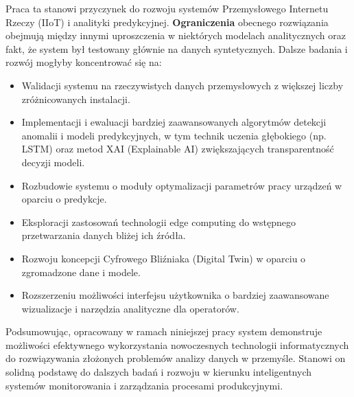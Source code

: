 Praca ta stanowi przyczynek do rozwoju systemów Przemysłowego Internetu Rzeczy (IIoT) i analityki predykcyjnej. \textbf{Ograniczenia} obecnego rozwiązania obejmują między innymi uproszczenia w niektórych modelach analitycznych oraz fakt, że system był testowany głównie na danych syntetycznych. Dalsze badania i rozwój mogłyby koncentrować się na:
\begin{itemize}
    \item Walidacji systemu na rzeczywistych danych przemysłowych z większej liczby zróżnicowanych instalacji.
    \item Implementacji i ewaluacji bardziej zaawansowanych algorytmów detekcji anomalii i modeli predykcyjnych, w tym technik uczenia głębokiego (np. LSTM) oraz metod XAI (Explainable AI) zwiększających transparentność decyzji modeli.
    \item Rozbudowie systemu o moduły optymalizacji parametrów pracy urządzeń w oparciu o predykcje.
    \item Eksploracji zastosowań technologii edge computing do wstępnego przetwarzania danych bliżej ich źródła.
    \item Rozwoju koncepcji Cyfrowego Bliźniaka (Digital Twin) w oparciu o zgromadzone dane i modele.
    \item Rozszerzeniu możliwości interfejsu użytkownika o bardziej zaawansowane wizualizacje i narzędzia analityczne dla operatorów.
\end{itemize}

Podsumowując, opracowany w ramach niniejszej pracy system demonstruje możliwości efektywnego wykorzystania nowoczesnych technologii informatycznych do rozwiązywania złożonych problemów analizy danych w przemyśle. Stanowi on solidną podstawę do dalszych badań i rozwoju w kierunku inteligentnych systemów monitorowania i zarządzania procesami produkcyjnymi. 